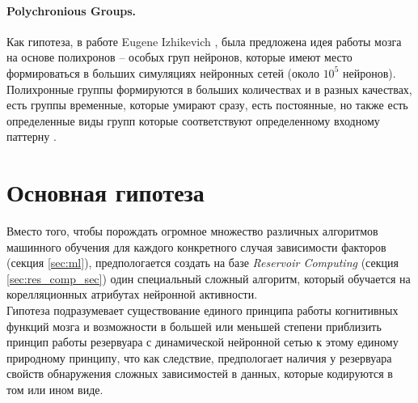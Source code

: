 \documentclass[a4paper,10pt]{article}
\begin{document}
\paragraph*{Polychronious Groups.}
Как гипотеза, в работе Eugene Izhikevich \cite{izh_groups}, была предложена идея работы мозга на основе полихронов -- особых груп нейронов, которые имеют место формироваться в больших симуляциях нейронных сетей (около $10^5$ нейронов). Полихронные группы формируются в больших количествах и в разных качествах, есть группы временные, которые умирают сразу, есть постоянные, но также есть определенные виды групп которые соответствуют определенному входному паттерну \cite{patt_groups}.

\section{Основная гипотеза}
Вместо того, чтобы порождать огромное множество различных алгоритмов машинного обучения для каждого конкретного случая зависимости факторов (секция \ref{sec:ml}), предпологается создать на базе \textit{Reservoir Computing} (секция \ref{sec:res_comp_sec}) один специальный сложный алгоритм, который обучается на корелляционных атрибутах нейронной активности.\\
\indent Гипотеза подразумевает существование единого принципа работы когнитивных функций мозга и возможности в большей или меньшей  степени приблизить принцип работы резервуара с динамической нейронной сетью к этому единому природному принципу, что как следствие, предпологает наличия у резервуара свойств обнаружения сложных зависимостей в данных, которые кодируются в том или ином виде.
\end{document}
